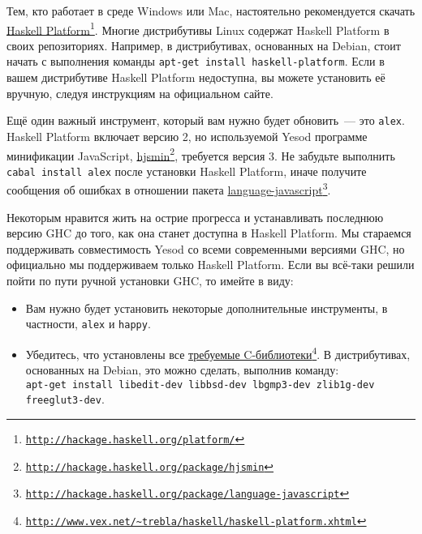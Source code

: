 Тем, кто работает в среде Windows или Mac, настоятельно рекомендуется скачать \href{http://hackage.haskell.org/platform/}{Haskell Platform}\footnote{\href{http://hackage.haskell.org/platform/}{\texttt{http://hackage.haskell.org/platform/}}}. Многие дистрибутивы Linux содержат Haskell Platform в своих репозиториях. Например, в дистрибутивах, основанных на Debian, стоит начать с выполнения команды \texttt{apt-get install haskell-platform}. Если в вашем дистрибутиве Haskell Platform недоступна, вы можете установить её вручную, следуя инструкциям на официальном сайте.

Ещё один важный инструмент, который вам нужно будет обновить~--- это \texttt{alex}. Haskell Platform включает версию 2, но используемой Yesod программе минификации JavaScript, \href{http://hackage.haskell.org/package/hjsmin}{hjsmin}\footnote{\href{http://hackage.haskell.org/package/hjsmin}{\texttt{http://hackage.haskell.org/package/hjsmin}}}, требуется версия 3. Не забудьте выполнить \texttt{cabal install alex} после установки Haskell Platform, иначе получите сообщения об ошибках в отношении пакета \href{http://hackage.haskell.org/package/language-javascript}{language-javascript}\footnote{\href{http://hackage.haskell.org/package/language-javascript}{\texttt{http://hackage.haskell.org/package/language-javascript}}}.

\begin{remark}
Некоторым нравится жить на острие прогресса и устанавливать последнюю версию GHC до того, как она станет доступна в Haskell Platform. Мы стараемся поддерживать совместимость Yesod со всеми современными версиями GHC, но официально мы поддерживаем только Haskell Platform. Если вы всё-таки решили пойти по пути ручной установки GHC, то имейте в виду:

\begin{itemize}
  \item Вам нужно будет установить некоторые дополнительные инструменты, в частности, \texttt{alex} и \texttt{happy}.
  \item Убедитесь, что установлены все \href{http://www.vex.net/~trebla/haskell/haskell-platform.xhtml}{требуемые C-библиотеки}\footnote{\href{http://www.vex.net/~trebla/haskell/haskell-platform.xhtml}{\texttt{http://www.vex.net/\~{}trebla/haskell/haskell-platform.xhtml}}}. В дистрибутивах, основанных на Debian, это можно сделать, выполнив команду:\\
 \texttt{apt-get install libedit-dev libbsd-dev lbgmp3-dev zlib1g-dev freeglut3-dev}.
\end{itemize}
\end{remark}

